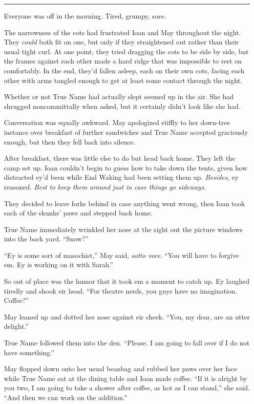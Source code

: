 \begin{center}\rule{0.5\linewidth}{0.5pt}\end{center}

Everyone was off in the morning. Tired, grumpy, sore.

The narrowness of the cots had frustrated Ioan and May throughout the night. They \emph{could} both fit on one, but only if they straightened out rather than their usual tight curl. At one point, they tried dragging the cots to be side by side, but the frames against each other made a hard ridge that was impossible to rest on comfortably. In the end, they'd fallen asleep, each on their own cots, facing each other with arms tangled enough to get at least some contact through the night.

Whether or not True Name had actually slept seemed up in the air. She had shrugged noncommittally when asked, but it certainly didn't look like she had.

Conversation was equally awkward. May apologized stiffly to her down-tree instance over breakfast of further sandwiches and True Name accepted graciously enough, but then they fell back into silence.

After breakfast, there was little else to do but head back home. They left the camp set up. Ioan couldn't begin to guess how to take down the tents, given how distracted ey'd been while End Waking had been setting them up. \emph{Besides,} ey reasoned. \emph{Best to keep them around just in case things go sideways.}

They decided to leave forks behind in case anything went wrong, then Ioan took each of the skunks' paws and stepped back home.

True Name immediately wrinkled her nose at the sight out the picture windows into the back yard. ``Snow?''

``Ey is some sort of masochist,'' May said, \emph{sotto voce}. ``You will have to forgive em. Ey is working on it with Sarah.''

So out of place was the humor that it took em a moment to catch up. Ey laughed tiredly and shook eir head. ``For theatre nerds, you guys have no imagination. Coffee?''

May leaned up and dotted her nose against eir cheek. ``You, my dear, are an utter delight.''

True Name followed them into the den. ``Please. I am going to fall over if I do not have something.''

May flopped down onto her usual beanbag and rubbed her paws over her face while True Name sat at the dining table and Ioan made coffee. ``If it is alright by you two, I am going to take a shower after coffee, as hot as I can stand,'' she said. ``And then we can work on the addition.''

